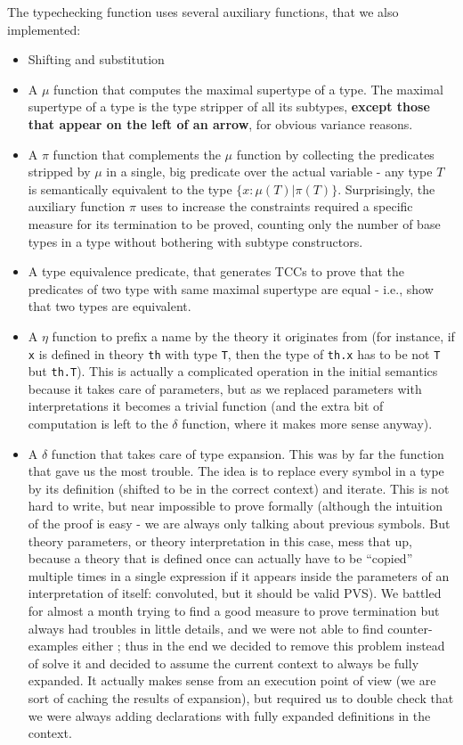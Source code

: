 \documentclass[utf8,a4paper]{article}
\begin{document}
The typechecking function uses several auxiliary functions, that we
also implemented:
\begin{itemize}
\item Shifting and substitution
\item A $\mu$ function that computes the maximal supertype of a
  type. The maximal supertype of a type is the type stripper of all
  its subtypes, \textbf{except those that appear on the left of an
    arrow}, for obvious variance reasons.
\item A $\pi$ function that complements the $\mu$ function by
  collecting the predicates stripped by $\mu$ in a single, big
  predicate over the actual variable - any type $T$ is semantically
  equivalent to the type $\{ x: \mu(T) | \pi(T) \}$. Surprisingly, the
  auxiliary function $\pi$ uses to increase the constraints required a
  specific measure for its termination to be proved, counting only the
  number of base types in a type without bothering with subtype
  constructors.
\item A type equivalence predicate, that generates TCCs to prove that
  the predicates of two type with same maximal supertype are equal -
  i.e., show that two types are equivalent.
\item A $\eta$ function to prefix a name by the theory it originates
  from (for instance, if \verb!x! is defined in theory \verb!th! with
  type \verb!T!, then the type of \verb!th.x! has to be not \verb!T!
  but \verb!th.T!). This is actually a complicated operation in the
  initial semantics because it takes care of parameters, but as we
  replaced parameters with interpretations it becomes a trivial
  function (and the extra bit of computation is left to the $\delta$
  function, where it makes more sense anyway).
\item A $\delta$ function that takes care of type expansion. This was
  by far the function that gave us the most trouble. The idea is to
  replace every symbol in a type by its definition (shifted to be in
  the correct context) and iterate. This is not hard to write, but
  near impossible to prove formally (although the intuition of the
  proof is easy - we are always only talking about previous
  symbols. But theory parameters, or theory interpretation in this
  case, mess that up, because a theory that is defined once can
  actually have to be ``copied'' multiple times in a single expression
  if it appears inside the parameters of an interpretation of itself:
  convoluted, but it should be valid PVS). We battled for almost a
  month trying to find a good measure to prove termination but always
  had troubles in little details, and we were not able to find
  counter-examples either ; thus in the end we decided to remove this
  problem instead of solve it and decided to assume the current
  context to always be fully expanded. It actually makes sense from an
  execution point of view (we are sort of caching the results of
  expansion), but required us to double check that we were always
  adding declarations with fully expanded definitions in the context.


\end{itemize}
\end{document}
